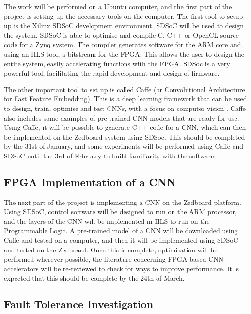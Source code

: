 \documentclass[12pt]{article}
\begin{document}
The work will be performed on a Ubuntu computer, and the first part of the project is setting up the necessary tools on the computer. The first tool to setup up is the Xilinx SDSoC development environment. SDSoC will be used to design the system. SDSoC is able to optimise and compile C, C++ or OpenCL source code for a Zynq system. The compiler generates software for the ARM core and, using an HLS tool, a bitstream for the FPGA. This allows the user to design the entire system, easily accelerating functions with the FPGA. SDSoc is a very powerful tool, facilitating the rapid development and design of firmware.

The other important tool to set up is called Caffe (or Convolutional Architecture for Fast Feature Embedding). This is a deep learning framework that can be used to design, train, optimise and test CNNs, with a focus on computer vision \cite{jia2014caffe}. Caffe also includes some examples of pre-trained CNN models that are ready for use. Using Caffe, it will be possible to generate C++ code for a CNN, which can then be implemented on the Zedboard system using SDSoc. This should be completed by the 31st of January, and some experiments will be performed using Caffe and SDSoC until the 3rd of February to build familiarity with the software.

\subsection{FPGA Implementation of a CNN}
\label{sec:ImpPlan-FPGAImplOfCnn}
\vspace{-12pt}

The next part of the project is implementing a CNN on the Zedboard platform. Using SDSoC, control software will be designed to run on the ARM processor, and the layers of the CNN will be implemented in HLS to run on the Programmable Logic. A pre-trained model of a CNN will be downloaded using Caffe and tested  on a computer, and then it will be implemented using SDSoC and tested on the Zedboard. Once this is complete, optimisation will be performed wherever possible, the literature concerning FPGA based CNN accelerators will be re-reviewed to check for ways to improve performance. It is expected that this should be complete by the 24th of March.

\subsection{Fault Tolerance Investigation}
\label{sec:ImpPlan-FaultTolInv}
\vspace{-12pt}
\end{document}
